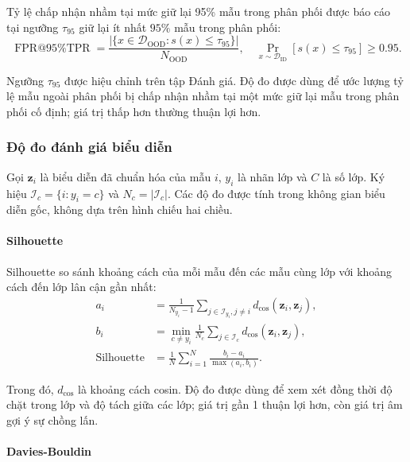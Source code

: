 Tỷ lệ chấp nhận nhầm tại mức giữ lại 95\% mẫu trong phân phối \cite{Liang2018ODIN,Liu2020EnergyOOD} được báo cáo tại ngưỡng $\tau_{95}$ giữ lại ít nhất $95\%$ mẫu trong phân phối:
\begin{equation}
\operatorname{FPR@95\%TPR}=\frac{|\{x\in\mathcal{D}_{\mathrm{OOD}}:s(x)\leq\tau_{95}\}|}{N_{\mathrm{OOD}}},
\quad
\Pr_{x\sim\mathcal{D}_{\mathrm{ID}}}[s(x)\leq\tau_{95}]\geq0.95.
\label{eq:ch4_fpr95}
\end{equation}

Ngưỡng $\tau_{95}$ được hiệu chỉnh trên tập Đánh giá. Độ đo được dùng để ước lượng tỷ lệ mẫu ngoài phân phối bị chấp nhận nhầm tại một mức giữ lại mẫu trong phân phối cố định; giá trị thấp hơn thường thuận lợi hơn.

\subsubsection{Độ đo đánh giá biểu diễn}

Gọi $\boldsymbol{z}_i$ là biểu diễn đã chuẩn hóa của mẫu $i$, $y_i$ là nhãn lớp và $C$ là số lớp. Ký hiệu $\mathcal{I}_c=\{i:y_i=c\}$ và $N_c=|\mathcal{I}_c|$. Các độ đo được tính trong không gian biểu diễn gốc, không dựa trên hình chiếu hai chiều.

\paragraph{Silhouette}

Silhouette \cite{Rousseeuw1987Silhouettes} so sánh khoảng cách của mỗi mẫu đến các mẫu cùng lớp với khoảng cách đến lớp lân cận gần nhất:
\begin{equation}
\begin{aligned}
a_i&=\frac{1}{N_{y_i}-1}\sum_{j\in\mathcal{I}_{y_i},j\ne i}
d_{\cos}(\boldsymbol{z}_i,\boldsymbol{z}_j),\\
b_i&=\min_{c\ne y_i}\frac{1}{N_c}\sum_{j\in\mathcal{I}_c}
d_{\cos}(\boldsymbol{z}_i,\boldsymbol{z}_j),\\
\operatorname{Silhouette}&=\frac{1}{N}\sum_{i=1}^{N}
\frac{b_i-a_i}{\max(a_i,b_i)}.
\end{aligned}
\label{eq:ch4_silhouette}
\end{equation}

Trong đó, $d_{\cos}$ là khoảng cách cosin. Độ đo được dùng để xem xét đồng thời độ chặt trong lớp và độ tách giữa các lớp; giá trị gần 1 thuận lợi hơn, còn giá trị âm gợi ý sự chồng lấn.

\paragraph{Davies-Bouldin}

